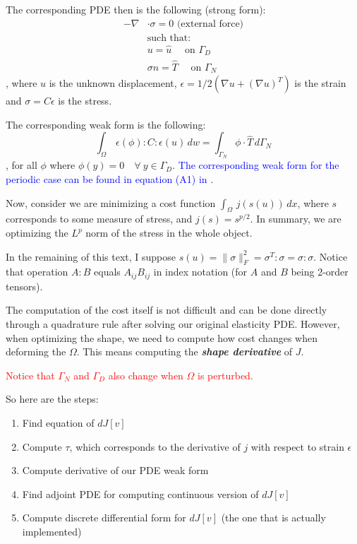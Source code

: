 \documentclass[11pt]{article}
\newcommand{\red}{\textcolor{red}}
\newcommand{\blue}{\textcolor{blue}}
\begin{document}
The corresponding PDE then is the following (strong form):
\begin{align*}
  - \nabla & \cdot \sigma = 0 \text{ (external force)} \\
  &\text{such that: } \\
  &u =  \hat u \quad \text{ on $\Gamma_D$}\\
  &\sigma n = \hat T \quad \text{ on $\Gamma_N$}
\end{align*}
, where $u$ is the unknown displacement, $\epsilon = 1/2 (\nabla u + (\nabla u)^T)$ is the strain and $\sigma = C \epsilon$ is the stress.

The corresponding weak form is the following:
\begin{equation}
\int_\Omega\, \epsilon(\phi) : C : \epsilon(u)\, dw = \int_{\Gamma_N} \phi \cdot \hat T\, d\Gamma_N
  \label{eq:weakform}
\end{equation}
, for all $\phi$ where $\phi(y) = 0 \quad \forall \:  y \in \Gamma_D$. \blue{The corresponding weak form for the periodic case can be found in equation (A1) in \cite{panetta2017}}.

Now, consider we are minimizing a cost function $\int_\Omega\, j(s(u))\, dx$, where $s$ corresponds to some measure of stress, and $j(s) = s^{p/2}$. In summary, we are optimizing the $L^p$ norm of the stress in the whole object.

In the remaining of this text, I suppose $s(u) = \| \sigma \|^2_F = \sigma^T : \sigma = \sigma : \sigma$. Notice that operation $A:B$ equals $A_{ij} B_{ij}$ in index notation (for $A$ and $B$ being 2-order tensors).

The computation of the cost itself is not difficult and can be done directly through a quadrature rule after solving our original elasticity PDE. However, when optimizing the shape, we need to compute how cost changes when deforming the $\Omega$. This means computing the \textbf{\emph{shape derivative}} of $J$.

\red{Notice that $\Gamma_{N}$ and $\Gamma_{D}$ also change when $\Omega$ is perturbed.}

So here are the steps:
\begin{enumerate}
  \item Find equation of $dJ[v]$
  \item Compute $\tau$, which corresponds to the derivative of $j$ with respect to strain $\epsilon$
  \item Compute derivative of our PDE weak form
  \item Find adjoint PDE for computing continuous version of $dJ[v]$
  \item Compute discrete differential form for $dJ[v]$ (the one that is actually implemented)
\end{enumerate}
\end{document}
